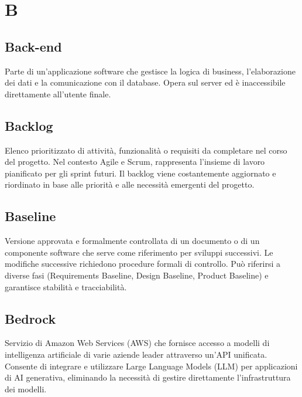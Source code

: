 \documentclass[a4paper,11pt]{article}
\begin{document}
\newpage









\section{B}

\subsection{Back-end}
Parte di un'applicazione software che gestisce la logica di business, l'elaborazione dei dati e la comunicazione con il database. Opera sul server ed è inaccessibile direttamente all'utente finale.






\subsection{Backlog}
Elenco prioritizzato di attività, funzionalità o requisiti da completare nel corso del progetto. Nel contesto Agile e Scrum, rappresenta l'insieme di lavoro pianificato per gli sprint futuri. Il backlog viene costantemente aggiornato e riordinato in base alle priorità e alle necessità emergenti del progetto.









\subsection{Baseline}
Versione approvata e formalmente controllata di un documento o di un componente software che serve come riferimento per sviluppi successivi. Le modifiche successive richiedono procedure formali di controllo. Può riferirsi a diverse fasi (Requirements Baseline, Design Baseline, Product Baseline) e garantisce stabilità e tracciabilità.









\subsection{Bedrock}
Servizio di Amazon Web Services (AWS) che fornisce accesso a modelli di intelligenza artificiale di varie aziende leader attraverso un'API unificata. Consente di integrare e utilizzare Large Language Models (LLM) per applicazioni di AI generativa, eliminando la necessità di gestire direttamente l'infrastruttura dei modelli.
\end{document}
